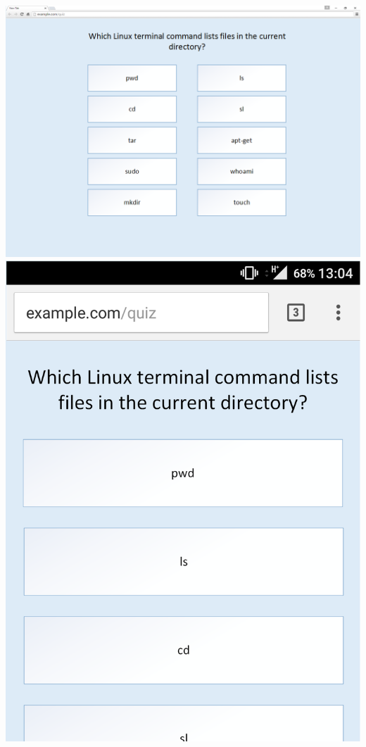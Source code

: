 \begin{center}
	\includegraphics[width=\textwidth]{Chapter3/Iter-4/Quiz-Web-Design-Cropped}\\
	\vspace{1cm}
	\includegraphics[scale=0.25]{Chapter3/Iter-4/Quiz-Mobile-Cropped}
\end{center}


